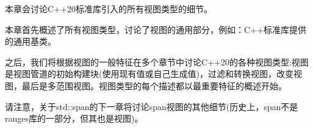 本章会讨论C++20标准库引入的所有视图类型的细节。

本章首先概述了所有视图类型，讨论了视图的通用部分，例如：C++标准库提供的通用基类。

之后，我们将根据视图的一般特征在多个章节中讨论C++20的各种视图类型:视图是视图管道的初始构建块(使用现有值或自己生成值)，过滤和转换视图，改变视图，最后是多范围视图。视图类型的每个描述都以最重要特征的概述开始。

请注意，关于std::span的下一章将讨论span视图的其他细节(历史上，span不是ranges库的一部分，但其也是视图)。